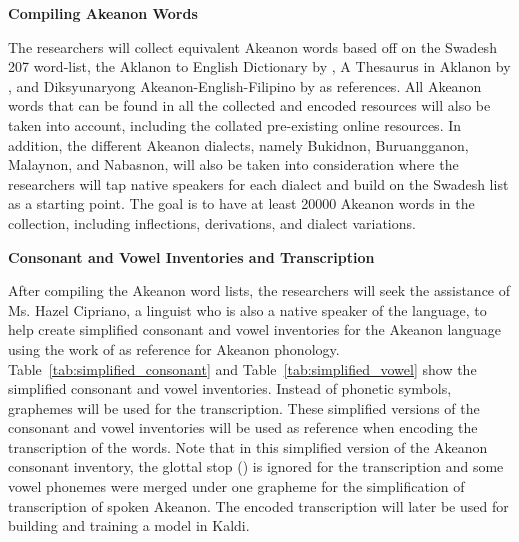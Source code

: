\textbf{Compiling Akeanon Words}

The researchers will collect equivalent Akeanon words based off on the Swadesh 207 word-list, the Aklanon to English Dictionary by , A Thesaurus in Aklanon by , and Diksyunaryong Akeanon-English-Filipino by  as references. All Akeanon words that can be found in all the collected and encoded resources will also be taken into account, including the collated pre-existing online resources. In addition, the different Akeanon dialects, namely Bukidnon, Buruangganon, Malaynon, and Nabasnon, will also be taken into consideration where the researchers will tap native speakers for each dialect and build on the Swadesh list as a starting point. The goal is to have at least 20000 Akeanon words in the collection, including inflections, derivations, and dialect variations.

\textbf{Consonant and Vowel Inventories and Transcription}

After compiling the Akeanon word lists, the researchers will seek the assistance of Ms. Hazel Cipriano, a linguist who is also a native speaker of the language, to help create simplified  consonant and vowel inventories for the Akeanon language using the work of  as reference for Akeanon phonology. Table~\ref{tab:simplified_consonant} and Table~\ref{tab:simplified_vowel} show the simplified consonant and vowel inventories. Instead of phonetic symbols, graphemes will be used for the transcription. These simplified versions of the consonant and vowel inventories will be used as reference when encoding the transcription of the words. Note that in this simplified version of the Akeanon consonant inventory, the glottal stop () is ignored for the transcription and some vowel phonemes were merged under one grapheme for the simplification of transcription of spoken Akeanon. The encoded  transcription will later be used for building and training a model in Kaldi.

